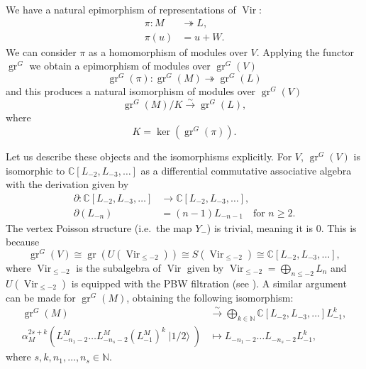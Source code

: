 \documentclass[a4paper, 12pt, reqno]{amsart}
\theoremstyle{remark}
\DeclareMathOperator{\Vir}{Vir}
\DeclareMathOperator{\gr}{gr}
\DeclareMathOperator{\vachalf}{|1/2\rangle}
\begin{document}
We have a natural epimorphism of representations of $\Vir$:
\begin{align*}
  \pi: M &\twoheadrightarrow L, \\
  \pi(u) &= u + W.
\end{align*}
We can consider $\pi$ as a homomorphism of modules over $V$.
Applying the functor $\gr^G$ we obtain a epimorphism of modules over $\gr^G(V)$
\begin{equation*}
  \gr^G(\pi): \gr^G(M) \twoheadrightarrow \gr^G(L)
\end{equation*}
and this produces a natural isomorphism of modules over $\gr^G(V)$
\begin{equation*}
  \gr^G(M)/K \xrightarrow{\sim} \gr^G(L),
\end{equation*}
where
\begin{equation}
  \label{eq:4}
  K = \ker(\gr^G(\pi)).
\end{equation}

Let us describe these objects and the isomorphisms explicitly.
For $V$, $\gr^G(V)$ is isomorphic to $\mathbb{C}[L_{-2}, L_{-3}, \dots]$ as a differential commutative associative algebra with the derivation given by
\begin{align*}
  \partial: \mathbb{C}[L_{-2}, L_{-3}, \dots] &\to \mathbb{C}[L_{-2}, L_{-3}, \dots], \\
  \partial(L_{-n}) &= (n - 1)L_{-n - 1} \quad \text{for }n \ge 2.
\end{align*}
The vertex Poisson structure (i.e.\ the map $Y_-$) is trivial, meaning it is $0$.
This is because
\begin{equation*}
  \gr^G(V) \cong \gr(U(\Vir_{\le -2})) \cong S(\Vir_{\le -2}) \cong \mathbb{C}[L_{-2}, L_{-3}, \dots],
\end{equation*}
where $\Vir_{\le -2}$ is the subalgebra of $\Vir$ given by $\Vir_{\le -2} = \bigoplus_{n \le -2}L_n$ and $U(\Vir_{\le -2})$ is equipped with the PBW filtration (see \cite[\S2]{dixmier_enveloping_1996}).
A similar argument can be made for $\gr^G(M)$, obtaining the following isomorphism:
\begin{align*}
  \gr^G(M) &\xrightarrow{\sim} \bigoplus_{k \in \mathbb{N}}\mathbb{C}[L_{-2}, L_{-3}, \dots]L_{-1}^k, \\
  \alpha_M^{2s + k}(L_{-n_1 - 2}^M\dots L_{-n_s - 2}^M(L_{-1}^M)^k\vachalf) &\mapsto L_{-n_1 - 2}\dots L_{-n_s - 2}L_{-1}^k,
\end{align*}
where $s, k, n_1, \dots, n_s \in \mathbb{N}$.
\end{document}
